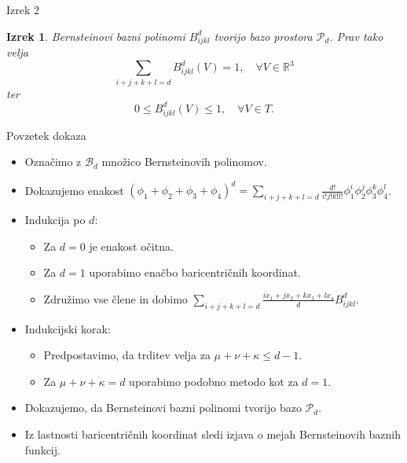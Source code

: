 \documentclass{beamer}
\newtheorem{theorem1}{Izrek}
\begin{document}
\begin{frame}{Izrek 2}
\begin{theorem1}\label{izrek_bernstein}
    Bernsteinovi bazni polinomi $B_{ijkl}^d$ tvorijo bazo prostora $\mathcal{P}_d$.
    Prav tako velja 
    \begin{equation}\label{eq_partcija_enote}
        \sum_{i+j+k+l = d} B_{ijkl}^d(V) = 1, \quad \forall V \in \mathbb{R}^3     
    \end{equation}
    ter
    \begin{equation}
        0 \leq B_{ijkl}^d(V) \leq 1, \quad \forall V \in T.
    \end{equation}
\end{theorem1}
\end{frame}

\begin{frame}{Povzetek dokaza}
    \begin{itemize}
        \item Označimo z $\mathcal{B}_d$ množico Bernsteinovih polinomov.
        \item Dokazujemo enakost $\left( \phi_1 + \phi_2 + \phi_3 + \phi_4 \right)^d = \sum_{i+j+k+l = d} \frac{d!}{i!j!k!l!} \phi_1^i \phi_2^j \phi_3^k \phi_4^l$.
        \item Indukcija po $d$:
        \begin{itemize}
            \item Za $d = 0$ je enakost očitna.
            \item Za $d = 1$ uporabimo enačbo baricentričnih koordinat.
            \item Združimo vse člene in dobimo $\sum_{i+j+k+l = d} \frac{ix_1 + jx_2 + k x_3 + l x_4}{d} B_{ijkl}^d$.
        \end{itemize}
        \item Indukcijski korak:
        \begin{itemize}
            \item Predpostavimo, da trditev velja za $\mu + \nu + \kappa \leq d-1$.
            \item Za $\mu + \nu + \kappa = d$ uporabimo podobno metodo kot za $d = 1$.
        \end{itemize}
        \item Dokazujemo, da Bernsteinovi bazni polinomi tvorijo bazo $\mathcal{P}_d$.
        \item Iz lastnosti baricentričnih koordinat sledi izjava o mejah Bernsteinovih baznih funkcij.
    \end{itemize}
\end{frame}
\end{document}
